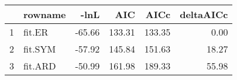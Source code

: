 \begin{table}[ht]
\centering
\begin{tabular}{rlrrrr}
  \hline
 & rowname & -lnL & AIC & AICc & deltaAICc \\ 
  \hline
1 & fit.ER & -65.66 & 133.31 & 133.35 & 0.00 \\ 
  2 & fit.SYM & -57.92 & 145.84 & 151.63 & 18.27 \\ 
  3 & fit.ARD & -50.99 & 161.98 & 189.33 & 55.98 \\ 
   \hline
\end{tabular}
\end{table}
